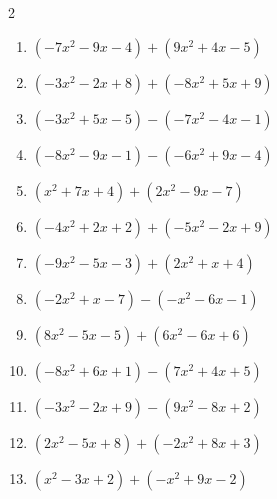 \begin{multicols}{2}
\begin{enumerate}

  \item $(-7x^{2}-9x-4)+(9x^{2}+4x-5)$


\columnbreak %

\resetques

  \item $(-3x^{2}-2x+8)+(-8x^{2}+5x+9)$


  \item $(-3x^{2}+5x-5)-(-7x^{2}-4x-1)$


  \item $(-8x^{2}-9x-1)-(-6x^{2}+9x-4)$


  \item $(x^{2}+7x+4)+(2x^{2}-9x-7)$


  \item $(-4x^{2}+2x+2)+(-5x^{2}-2x+9)$


  \item $(-9x^{2}-5x-3)+(2x^{2}+x+4)$


  \item $(-2x^{2}+x-7)-(-x^{2}-6x-1)$


  \item $(8x^{2}-5x-5)+(6x^{2}-6x+6)$


  \item $(-8x^{2}+6x+1)-(7x^{2}+4x+5)$


  \item $(-3x^{2}-2x+9)-(9x^{2}-8x+2)$


  \item $(2x^{2}-5x+8)+(-2x^{2}+8x+3)$

        \phantom{$=3x+11$}

  \item $(x^{2}-3x+2)+(-x^{2}+9x-2)$


\end{enumerate}
\end{multicols}
